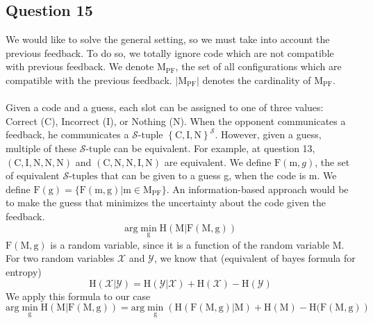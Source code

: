 \documentclass{article}
\begin{document}
\subsection*{Question 15}
We would like to solve the general setting, so we must take into account the previous feedback. To do so, we totally ignore code which are not compatible with previous feedback. We denote $\mbox{M}_{\mbox{PF}}$, the set of all configurations which are compatible with the previous feedback. $\left|\mbox{M}_{\mbox{PF}} \right|$ denotes the cardinality of $\mbox{M}_{\mbox{PF}}$.
\\\\
Given a code and a guess, each slot can be assigned to one of three values: Correct (C), Incorrect (I), or Nothing (N). When the opponent communicates a feedback, he communicates a $\mathcal{S}\mbox{-tuple}$ $\left\{\mbox{C},\mbox{I},\mbox{N}\right\}^\mathcal{S}$. However, given a guess, multiple of these $\mathcal{S}\mbox{-tuple}$ can be equivalent. For example, at question 13, $(\mbox{C},\mbox{I},\mbox{N},\mbox{N},\mbox{N})$ and $(\mbox{C},\mbox{N},\mbox{N},\mbox{I},\mbox{N})$ are equivalent.
We define $\mbox{F}(\mbox{m},g)$, the set of equivalent $\mathcal{S}\mbox{-tuples}$ that can be given to a guess g, when the code is m. We define $\mbox{F}(\mbox{g}) = \{\mbox{F}(\mbox{m},\mbox{g})|\mbox{m} \in \mbox{M}_{\mbox{PF}}\}$.  An information-based approach would be to make the guess that minimizes the uncertainty about the code given the feedback. 
$$
\mbox{arg}\min_{\mbox{g}}\mbox{H}(\mbox{M}|\mbox{F}(\mbox{M},\mbox{g}))
$$
$\mbox{F}(\mbox{M},\mbox{g})$ is a random variable, since it is a function of the random variable M. For two random variables $\mathcal{X}$ and $\mathcal{Y}$, we know that (equivalent of bayes formula for entropy)
$$
\mbox{H}(\mathcal{X}|\mathcal{Y}) = \mbox{H}(\mathcal{Y}|\mathcal{X}) + \mbox{H}(\mathcal{X}) -\mbox{H}(\mathcal{Y})
$$
We apply this formula to our case
$$
\mbox{arg}\min_{\mbox{g}}\mbox{H}(\mbox{M}|\mbox{F}(\mbox{M},\mbox{g})) = \mbox{arg}\min_{\mbox{g}}\left(\mbox{H}(\mbox{F}(\mbox{M},\mbox{g})|\mbox{M}) + \mbox{H}(\mbox{M}) - \mbox{H}(\mbox{F}(\mbox{M},\mbox{g}) \right)
$$
\end{document}

